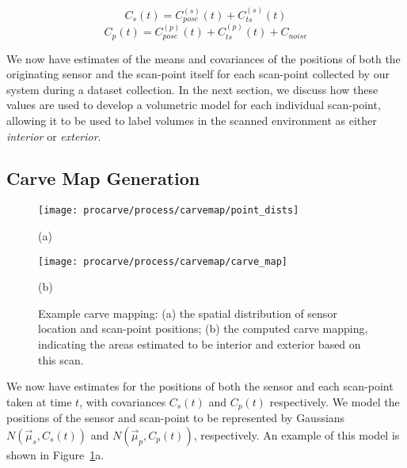 \documentclass[12pt,onecolumn,oneside]{book}
\begin{document}
\begin{equation}
	C_s(t) = C^{(s)}_{pose}(t) + C^{(s)}_{ts}(t)
\end{equation}
\begin{equation}
	C_p(t) = C^{(p)}_{pose}(t) + C^{(p)}_{ts}(t) + C_{noise}
\end{equation}

We now have estimates of the means and covariances of the positions of both the originating sensor and the scan-point itself for each scan-point collected by our system during a dataset collection.  In the next section, we discuss how these values are used to develop a volumetric model for each individual scan-point, allowing it to be used to label volumes in the scanned environment as either {\it interior} or {\it exterior}.

\subsection{Carve Map Generation}
\label{ssec:carve_map_generation}

\begin{figure}[t]
	\centering
	\begin{minipage}[t]{0.50\linewidth} %
		\centerline{\texttt{[image: procarve/process/carvemap/point\_dists]}}
		\centerline{(a)}
	\end{minipage}
	\hfill
	\begin{minipage}[t]{0.50\linewidth} %
		\centerline{\texttt{[image: procarve/process/carvemap/carve\_map]}}
		\centerline{(b)}
	\end{minipage}

	\caption[Example carve mapping.]{Example carve mapping: (a) the spatial distribution of sensor location and scan-point positions; (b) the computed carve mapping, indicating the areas estimated to be interior and exterior based on this scan.}
	\label{fig:carvemap}
\end{figure}

We now have estimates for the positions of both the sensor and each scan-point taken at time $t$, with covariances $C_s(t)$ and $C_p(t)$ respectively.  We model the positions of the sensor and scan-point to be represented by Gaussians $N(\vec{\mu}_s,C_s(t))$ and $N(\vec{\mu}_p,C_p(t))$, respectively. An example of this model is shown in Figure~\ref{fig:carvemap}a.
\end{document}
